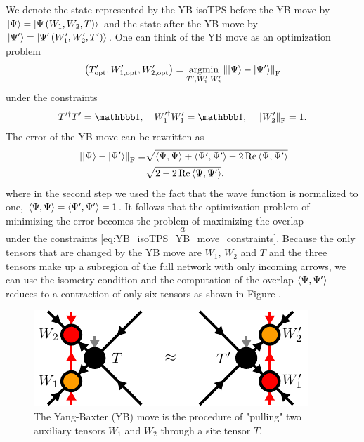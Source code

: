 We denote the state represented by the YB-isoTPS before the YB move by $\ket{\Psi} = \ket{\Psi\left(W_1, W_2, T\right)}$ and the state after the YB move by $\ket{\Psi^\prime} = \ket{\Psi^\prime\left(W_1^\prime, W_2^\prime, T^\prime\right)}$. One can think of the YB move as an optimization problem
\begin{equation}
	\label{eq:YB_isoTPS_YB_move_standard}
	\left(T^\prime_\text{opt},W_{1,\text{opt}}^\prime,W_{2,\text{opt}}^\prime\right) = \underset{T^\prime,W_1^\prime,W_2^\prime}{\operatorname{argmin}}\left\lVert \ket{\Psi} - \ket{\Psi^\prime}\right\rVert_\text{F}
\end{equation}
under the constraints
\begin{equation}
	\label{eq:YB_isoTPS_YB_move_constraints}
	T^{\prime\dagger}T^\prime = \id, \quad W_1^{\prime\dagger}W_1^\prime = \id, \quad \left\lVert W_2^\prime \right\rVert_\text{F} = 1.
\end{equation}
The error of the YB move can be rewritten as
\begin{equation}
	\label{eq:YB_isoTPS_YB_move_rewritten_error}
	\begin{split}
		\left\lVert \ket{\Psi} - \ket{\Psi^\prime} \right\rVert_\text{F} =& \sqrt{\braket{\Psi,\Psi} + \braket{\Psi^\prime,\Psi^\prime} - 2\operatorname{Re}\braket{\Psi,\Psi^\prime}} \\
		=& \sqrt{2 - 2\operatorname{Re}\braket{\Psi,\Psi^\prime}},
	\end{split}
\end{equation}
where in the second step we used the fact that the wave function is normalized to one, $\braket{\Psi,\Psi} = \braket{\Psi^\prime,\Psi^\prime} = 1$. It follows that the optimization problem of minimizing the error becomes the problem of maximizing the overlap
\begin{equation}
	\label{eq:YB_isoTPS_YB_move_alternative_formulation}
	a
\end{equation}
under the constraints \eqref{eq:YB_isoTPS_YB_move_constraints}. Because the only tensors that are changed by the YB move are $W_1$, $W_2$ and $T$ and the three tensors make up a subregion of the full network with only incoming arrows, we can use the isometry condition and the computation of the overlap $\braket{\Psi,\Psi^\prime}$ reduces to a contraction of only six tensors as shown in Figure .\par
\begin{figure}
	\centering
	\includegraphics[scale=1]{figures/tikz/YB_isoTPS/yang_baxter_move/yang_baxter_move.pdf}
	\caption{The Yang-Baxter (YB) move is the procedure of "pulling" two auxiliary tensors $W_1$ and $W_2$ through a site tensor $T$.}
	\label{fig:YB_isoTPS_YB_move_closeup}
\end{figure}
